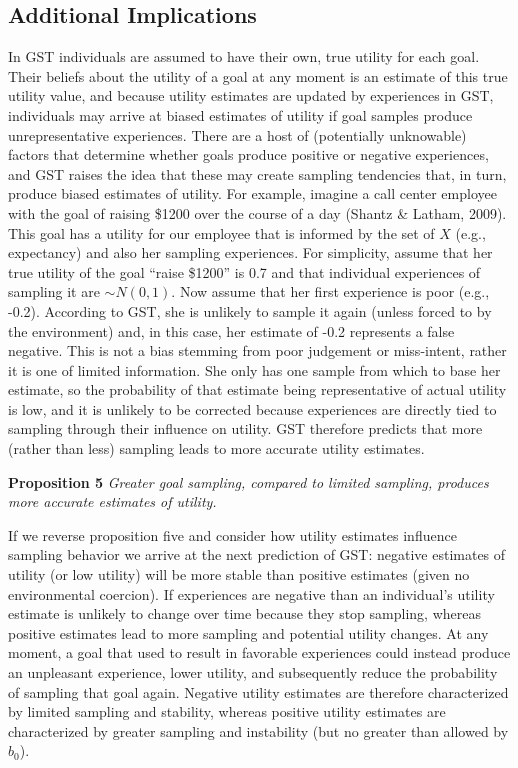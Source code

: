 \documentclass[english,,man]{apa6}
\theoremstyle{definition}
\theoremstyle{definition}
\theoremstyle{definition}
\theoremstyle{remark}
\begin{document}
\hypertarget{additional-implications}{%
\subsection{Additional Implications}\label{additional-implications}}

In GST individuals are assumed to have their own, true utility for each
goal. Their beliefs about the utility of a goal at any moment is an
estimate of this true utility value, and because utility estimates are
updated by experiences in GST, individuals may arrive at biased
estimates of utility if goal samples produce unrepresentative
experiences. There are a host of (potentially unknowable) factors that
determine whether goals produce positive or negative experiences, and
GST raises the idea that these may create sampling tendencies that, in
turn, produce biased estimates of utility. For example, imagine a call
center employee with the goal of raising \$1200 over the course of a day
(Shantz \& Latham, 2009). This goal has a utility for our employee that
is informed by the set of \(X\) (e.g., expectancy) and also her sampling
experiences. For simplicity, assume that her true utility of the goal
\enquote{raise \$1200} is 0.7 and that individual experiences of
sampling it are \(\sim {N}(0,1)\). Now assume that her first experience
is poor (e.g., -0.2). According to GST, she is unlikely to sample it
again (unless forced to by the environment) and, in this case, her
estimate of -0.2 represents a false negative. This is not a bias
stemming from poor judgement or miss-intent, rather it is one of limited
information. She only has one sample from which to base her estimate, so
the probability of that estimate being representative of actual utility
is low, and it is unlikely to be corrected because experiences are
directly tied to sampling through their influence on utility. GST
therefore predicts that more (rather than less) sampling leads to more
accurate utility estimates.

\textbf{Proposition 5} \emph{Greater goal sampling, compared to limited
sampling, produces more accurate estimates of utility.}

If we reverse proposition five and consider how utility estimates
influence sampling behavior we arrive at the next prediction of GST:
negative estimates of utility (or low utility) will be more stable than
positive estimates (given no environmental coercion). If experiences are
negative than an individual's utility estimate is unlikely to change
over time because they stop sampling, whereas positive estimates lead to
more sampling and potential utility changes. At any moment, a goal that
used to result in favorable experiences could instead produce an
unpleasant experience, lower utility, and subsequently reduce the
probability of sampling that goal again. Negative utility estimates are
therefore characterized by limited sampling and stability, whereas
positive utility estimates are characterized by greater sampling and
instability (but no greater than allowed by \(b_0\)).
\end{document}
